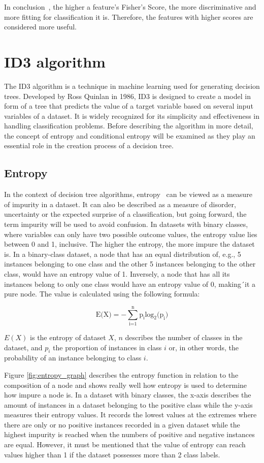 In conclusion~\cite{feature_selection}, the higher a feature's Fisher's Score, the more discriminative and more fitting for classification it is. Therefore, the features with higher scores are considered more useful.

\section{ID3 algorithm} \label{ID3}
The ID3 algorithm is a technique in machine learning used for generating decision trees. Developed by Ross Quinlan in 1986, ID3 is designed to create a model in form of a tree that predicts the value of a target variable based on several input variables of a dataset. It is widely recognized for its simplicity and effectiveness in handling classification problems. Before describing the algorithm in more detail, the concept of entropy and conditional entropy will be examined as they play an essential role in the creation process of a decision tree.

\subsection{Entropy} \label{entropy}
In the context of decision tree algorithms, entropy~\cite{entropy_dash} can be viewed as a measure of impurity in a dataset. It can also be described as a measure of disorder, uncertainty or the expected surprise of a classification, but going forward, the term impurity will be used to avoid confusion. In datasets with binary classes, where variables can only have two possible outcome values, the entropy value lies between 0 and 1, inclusive. The higher the entropy, the more impure the dataset is. In a binary-class dataset, a node that has an equal distribution of, e.g., 5 instances belonging to one class and the other 5 instances belonging to the other class, would have an entropy value of 1. Inversely, a node that has all its instances belong to only one class would have an entropy value of 0, making´it a pure node.
The value is calculated using the following formula:


\[ \text{E(X)} = -\sum_\text{i=1}^\text{n} \text{p}_\text{i} {\text{log}_\text{2} \text{(p}_\text{i})} \]


$E(X)$ is the entropy of dataset $X$, $n$ describes the number of classes in the dataset, and $p_i$ the proportion of instances in class $i$ or, in other words, the probability of an instance belonging to class $i$.

Figure \ref{fig:entropy_graph} describes the entropy function in relation to the composition of a node and shows really well how entropy is used to determine how impure a node is.
In a dataset with binary classes, the x-axis describes the amount of instances in a dataset belonging to the positive class while the y-axis measures their entropy values. It records the lowest values at the extremes where there are only or no positive instances recorded in a given dataset while the highest impurity is reached when the numbers of positive and negative instances are equal.
However, it must be mentioned that the value of entropy can reach values higher than 1 if the dataset possesses more than 2 class labels. 


